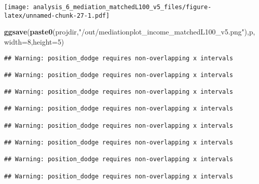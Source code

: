 \documentclass[
]{article}
\newenvironment{Shaded}{\begin{snugshade}}{\end{snugshade}}
\newcommand{\DataTypeTok}[1]{\textcolor[rgb]{0.13,0.29,0.53}{#1}}
\newcommand{\DecValTok}[1]{\textcolor[rgb]{0.00,0.00,0.81}{#1}}
\newcommand{\KeywordTok}[1]{\textcolor[rgb]{0.13,0.29,0.53}{\textbf{#1}}}
\newcommand{\NormalTok}[1]{#1}
\newcommand{\StringTok}[1]{\textcolor[rgb]{0.31,0.60,0.02}{#1}}
\begin{document}
\texttt{[image: analysis\_6\_mediation\_matchedL100\_v5\_files/figure-latex/unnamed-chunk-27-1.pdf]}

\begin{Shaded}
\begin{Highlighting}[]
\KeywordTok{ggsave}\NormalTok{(}\KeywordTok{paste0}\NormalTok{(projdir,}\StringTok{"/out/mediationplot_income_matchedL100_v5.png"}\NormalTok{),p,}\DataTypeTok{width=}\DecValTok{8}\NormalTok{,}\DataTypeTok{height=}\DecValTok{5}\NormalTok{)}
\end{Highlighting}
\end{Shaded}

\begin{verbatim}
## Warning: position_dodge requires non-overlapping x intervals

## Warning: position_dodge requires non-overlapping x intervals

## Warning: position_dodge requires non-overlapping x intervals

## Warning: position_dodge requires non-overlapping x intervals

## Warning: position_dodge requires non-overlapping x intervals

## Warning: position_dodge requires non-overlapping x intervals

## Warning: position_dodge requires non-overlapping x intervals

## Warning: position_dodge requires non-overlapping x intervals
\end{verbatim}
\end{document}
